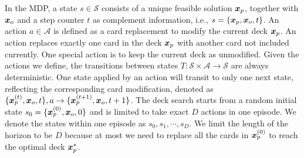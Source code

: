 In the MDP, a state $s \in \mathcal{S}$ consists of a unique feasible solution $\boldsymbol{x}_p$, together with $\boldsymbol{x}_o$ and a step counter $t$ as complement information, i.e., $s=\{\boldsymbol{x}_p, \boldsymbol{x}_o, t\}$. An action $a \in \mathcal{A}$ is defined as a card replacement to modify the current deck $\boldsymbol{x}_p$. An action replaces exactly one card in the deck $\boldsymbol{x}_p$ with another card not included currently. One special action is to keep the current deck as unmodified. Given the actions we define, the transitions between states $T: \mathcal{S} \times \mathcal{A} \rightarrow \mathcal{S}$ are always deterministic. One state applied by an action will transit to only one next state, reflecting the corresponding card modification, denoted as $\{\boldsymbol{x}^{(t)}_p, \boldsymbol{x}_o, t\}, a \rightarrow \{\boldsymbol{x}^{(t+1)}_p, \boldsymbol{x}_o, t+1\}$. The deck search starts from a random initial state $s_0=\{\boldsymbol{x}_p^{(0)}, \boldsymbol{x}_o, 0\}$ and is limited to take exact $D$ actions in one episode. We denote the states within one episode as $s_0, s_1, \cdots, s_D$. We limit the length of the horizon to be $D$ because at most we need to replace all the cards in $\boldsymbol{x}_p^{(0)}$ to reach the optimal deck $\boldsymbol{x}_p^*$. 




